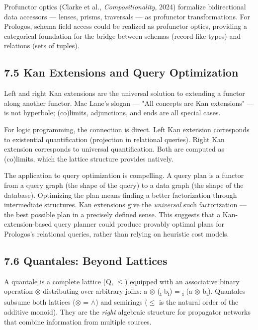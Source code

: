 \documentclass[11pt]{article}
\begin{document}
Profunctor optics (Clarke et al., \emph{Compositionality}, 2024) formalize bidirectional data accessors --- lenses, prisms, traversals --- as profunctor transformations. For Prologos, schema field access could be realized as profunctor optics, providing a categorical foundation for the bridge between schemas (record-like types) and relations (sets of tuples).
\subsection{7.5 Kan Extensions and Query Optimization}
\label{sec:org6b07b8a}

Left and right Kan extensions are the universal solution to extending a functor along another functor. Mac Lane's slogan --- "All concepts are Kan extensions" --- is not hyperbole; (co)limits, adjunctions, and ends are all special cases.

For logic programming, the connection is direct. Left Kan extension corresponds to existential quantification (projection in relational queries). Right Kan extension corresponds to universal quantification. Both are computed as (co)limits, which the lattice structure provides natively.

The application to query optimization is compelling. A query plan is a functor from a query graph (the shape of the query) to a data graph (the shape of the database). Optimizing the plan means finding a better factorization through intermediate structures. Kan extensions give the \emph{universal} such factorization --- the best possible plan in a precisely defined sense. This suggests that a Kan-extension-based query planner could produce provably optimal plans for Prologos's relational queries, rather than relying on heuristic cost models.
\subsection{7.6 Quantales: Beyond Lattices}
\label{sec:orgba554bc}

A quantale is a complete lattice (Q, \(\le\)) equipped with an associative binary operation \(\otimes\) distributing over arbitrary joins: a \(\otimes\) (\bigvee\textsubscript{i} b\textsubscript{i}) = \bigvee\textsubscript{i} (a \(\otimes\) b\textsubscript{i}). Quantales subsume both lattices (\(\otimes\) = \(\wedge\)) and semirings (\(\le\) is the natural order of the additive monoid). They are the \emph{right} algebraic structure for propagator networks that combine information from multiple sources.
\end{document}
